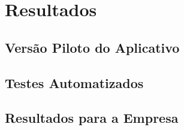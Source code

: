 \chapter{Resultados} \label{cap:results}

\section{Versão Piloto do Aplicativo}

\section{Testes Automatizados}

\section{Resultados para a Empresa}